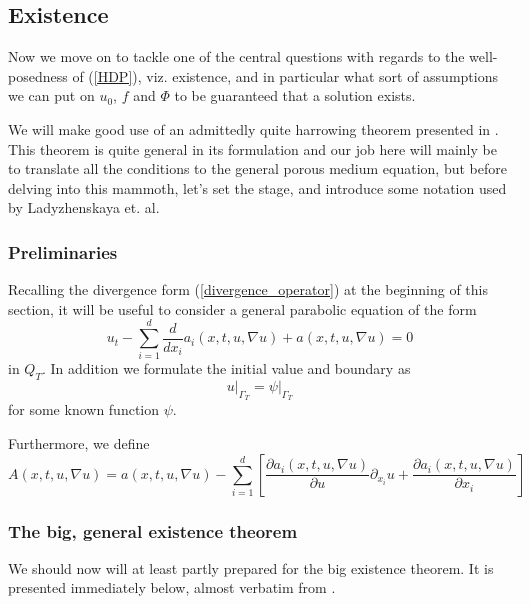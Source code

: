 \documentclass[11pt, a4paper]{article}
\begin{document}
\subsection{Existence}
Now we move on to tackle one of the central questions with regards to the well-posedness of (\ref{HDP}), viz. existence, and in particular what sort of assumptions we can put on $u_0$, $f$ and $\Phi$ to be guaranteed that a solution exists.

We will make good use of an admittedly quite harrowing theorem presented in \citep{ladyzhenskaya}. This theorem is quite general in its formulation and our job here will mainly be to translate all the conditions to the general porous medium equation, but before delving into this mammoth, let's set the stage, and introduce some notation used by Ladyzhenskaya et. al.

\subsubsection{Preliminaries}

Recalling the divergence form (\ref{divergence_operator}) at the beginning of this section, it will be useful to consider a general parabolic equation of the form
\begin{equation}
\label{lady_parabolic_eq}
	u_t - \sum_{i=1}^d\frac{d}{dx_i}a_i(x,t,u,\nabla u) + a(x,t,u,\nabla u) = 0
\end{equation}
in $Q_T$. In addition we formulate the initial value and boundary as
\begin{equation}
\label{lady_bc}
	u\big|_{\Gamma_T} = \psi\big|_{\Gamma_T}
\end{equation}
for some known function $\psi$.

Furthermore, we define
\begin{equation*}
A(x,t,u,\nabla u) = a(x,t,u,\nabla u) - \sum_{i=1}^d \left[ \frac{\partial a_i(x,t,u,\nabla u)}{\partial u}\partial_{x_i}u + \frac{\partial a_i(x,t,u,\nabla u)}{\partial x_i} \right]
\end{equation*}


\subsubsection{The big, general existence theorem}
We should now will at least partly prepared for the big existence theorem. It is presented immediately below, almost verbatim from \citep[ Theorem 6.1, p. 452]{ladyzhenskaya}.
\end{document}
